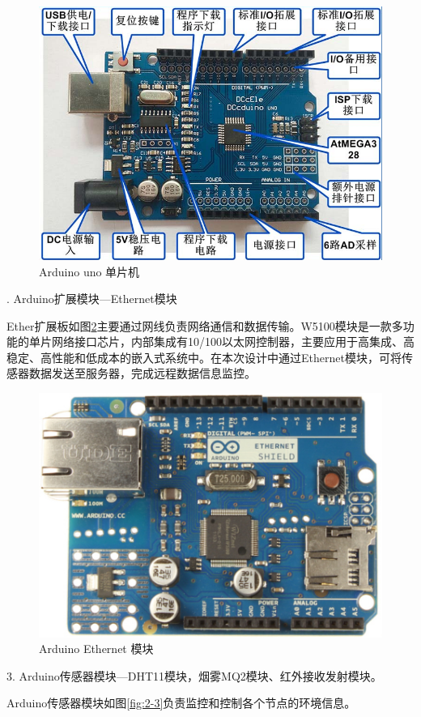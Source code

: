 \begin{figure}[htbp]
	\centering
	\includegraphics[width=0.85\linewidth]{figure/2-1}
	\caption{Arduino uno 单片机}
	\label{fig:2-1}
\end{figure}

. Arduino扩展模块---Ethernet模块

Ether扩展板如图\ref{fig:2-2}主要通过网线负责网络通信和数据传输。W5100模块是一款多功能的单片网络接口芯片，内部集成有10/100以太网控制器，主要应用于高集成、高稳定、高性能和低成本的嵌入式系统中。在本次设计中通过Ethernet模块，可将传感器数据发送至服务器，完成远程数据信息监控。

\begin{figure}[htbp]
	\centering
	\includegraphics[width=0.85\linewidth]{figure/2-2}
	\caption{Arduino Ethernet 模块}
	\label{fig:2-2}
\end{figure}

3. Arduino传感器模块---DHT11模块，烟雾MQ2模块、红外接收发射模块。

Arduino传感器模块如图\ref{fig:2-3}负责监控和控制各个节点的环境信息。

